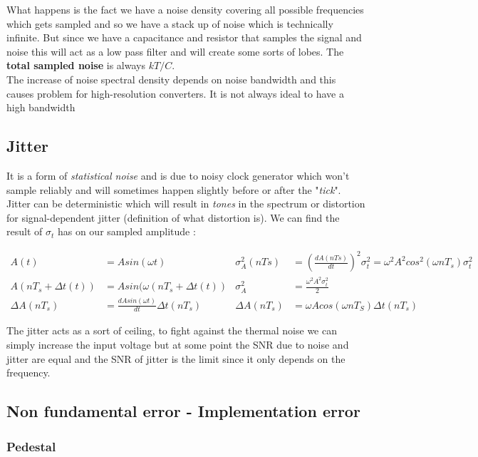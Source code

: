 \documentclass{report}
\begin{document}
What happens is the fact we have a noise density covering all possible frequencies which gets sampled and so we have a stack up of noise which is technically infinite. But since we have a capacitance and resistor that samples the signal and noise this will act as a low pass filter and will create some sorts of lobes. The \textbf{total sampled noise} is always $kT/C$.\\
The increase of noise spectral density depends on noise bandwidth and this causes problem for high-resolution converters. It is not always ideal to have a high bandwidth

\subsection{Jitter}

It is a form of \textit{statistical noise} and is due to noisy clock generator which won't sample reliably and will sometimes happen slightly before or after the "\textit{tick}". Jitter can be deterministic which will result in \textit{tones} in the spectrum or distortion for signal-dependent jitter (definition of what distortion is). We can find the result of $\sigma_t$ has on our sampled amplitude : 

\begin{align}
    A(t) &= A sin(\omega t) & \sigma_A^2(nTs) &= \left(\frac{dA(nTs)}{dt}\right)^2 \sigma_t^2 = \omega^2A^2 cos^2(\omega nT_s)\sigma_t^2\\
    A(nT_s+\Delta t(t)) &= A sin(\omega (nT_s + \Delta t(t)) & \sigma_A^2 &= \frac{\omega^2 A^2 \sigma_t^2}{2}\\ 
    \Delta A(nT_s) &= \frac{d A sin(\omega t)}{dt} \Delta t(nT_s) & \Delta A(nT_s) &=  \omega A cos(\omega nT_S)\Delta t(nT_s) 
\end{align}

The jitter acts as a sort of ceiling, to fight against the thermal noise we can simply increase the input voltage but at some point the SNR due to noise and jitter are equal and the SNR of jitter is the limit since it only depends on the frequency.

\subsection{Non fundamental error - Implementation error}

\subsubsection{Pedestal}
\end{document}
